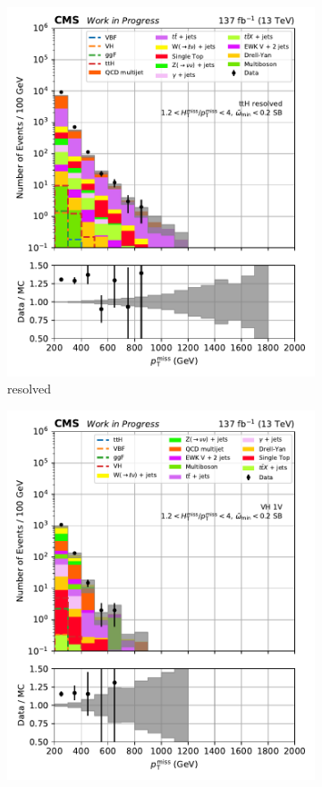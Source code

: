 \begin{figure}[htbp]
\begin{subfigure}[b]{0.24\textwidth}
        \includegraphics[width=\textwidth]{figures/region_plots/2016to18/sideband_0/ttH_resolved.pdf}
        \caption{\ttH resolved}
    \end{subfigure}
    \hfill
    \begin{subfigure}[b]{0.24\textwidth}
        \includegraphics[width=\textwidth]{figures/region_plots/2016to18/sideband_0/VH_1V.pdf}

\end{subfigure}
\end{figure}
